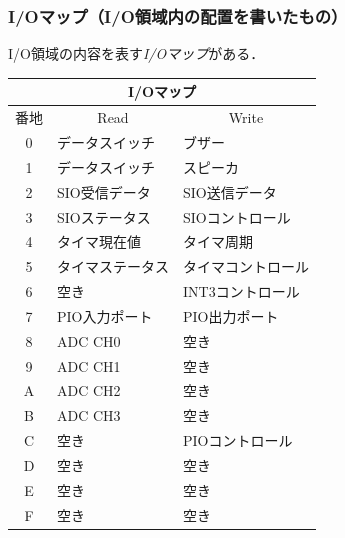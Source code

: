 \documentclass{beamer}                 %
\begin{document}
\begin{frame}
  \frametitle{I/Oマップ（I/O領域内の配置を書いたもの）}
  I/O領域の内容を表す\emph{I/Oマップ}がある．
  \vfill
    \footnotesize\begin{tabular}{| c | l | l |}
    \hline
    \multicolumn{3}{|c|}{I/Oマップ} \\
    \hline
    番地 & \multicolumn{1}{|c|}{Read} & \multicolumn{1}{|c|}{Write} \\
    \hline
    0 & データスイッチ   & ブザー \\
    1 & データスイッチ   & スピーカ \\
    2 & SIO受信データ    & SIO送信データ \\
    3 & SIOステータス    & SIOコントロール \\
    4 & タイマ現在値     & タイマ周期 \\
    5 & タイマステータス & タイマコントロール \\
    6 & 空き             & INT3コントロール \\
    7 & PIO入力ポート    & PIO出力ポート \\
    8 & ADC CH0          & 空き \\
    9 & ADC CH1          & 空き \\
    A & ADC CH2          & 空き \\
    B & ADC CH3          & 空き \\
    C & 空き             & PIOコントロール \\
    D & 空き             & 空き \\
    E & 空き             & 空き \\
    F & 空き             & 空き \\
    \hline
    \end{tabular}
  \vfill
  \vfill
\end{frame}
\end{document}
